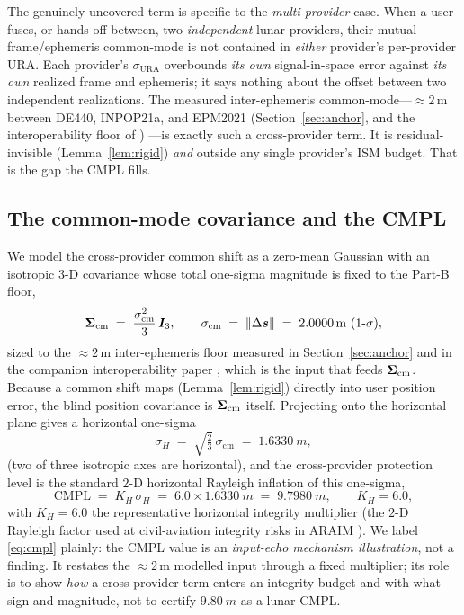 The genuinely uncovered term is specific to the \emph{multi-provider} case. When a user
fuses, or hands off between, two \emph{independent} lunar providers, their mutual
frame/ephemeris common-mode is not contained in \emph{either} provider's per-provider
URA. Each provider's $\sigma_{\mathrm{URA}}$ overbounds \emph{its own} signal-in-space
error against \emph{its own} realized frame and ephemeris; it says nothing about the
offset between two independent realizations. The measured inter-ephemeris
common-mode---$\approx\!2\,$m between DE440, INPOP21a, and EPM2021
(Section~\ref{sec:anchor}, and the interoperability floor of \citep{baweja2026interop})%
---is exactly such a cross-provider term. It is residual-invisible (Lemma~\ref{lem:rigid})
\emph{and} outside any single provider's ISM budget. That is the gap the CMPL fills.

\subsection{The common-mode covariance and the CMPL}
\label{sec:cmpldef}

We model the cross-provider common shift as a zero-mean Gaussian with an isotropic
$3$-D covariance whose total one-sigma magnitude is fixed to the Part-B floor,
\begin{equation}
  \Sig_{\mathrm{cm}} \;=\; \frac{\sigma_{\mathrm{cm}}^2}{3}\,\bm I_3,
  \qquad
  \sigma_{\mathrm{cm}} \;=\; \|\ds\| \;=\; \SI{2.0000}{m}\ \text{(1-}\sigma\text{)},
  \label{eq:cmcov}
\end{equation}
sized to the $\approx\!2\,$m inter-ephemeris floor measured in Section~\ref{sec:anchor}
and in the companion interoperability paper \citep{baweja2026interop}, which is the
input that feeds $\bm{\Sigma}_{\mathrm{cm}}$. Because a common shift maps (Lemma~\ref{lem:rigid})
directly into user position error, the blind position covariance is $\bm{\Sigma}_{\mathrm{cm}}$
itself. Projecting onto the horizontal plane gives a horizontal one-sigma
\begin{equation}
  \sigma_H \;=\; \sqrt{\tfrac{2}{3}}\,\sigma_{\mathrm{cm}} \;=\; \SI{1.6330}{m},
  \label{eq:sigmaH}
\end{equation}
(two of three isotropic axes are horizontal), and the cross-provider protection level is
the standard $2$-D horizontal Rayleigh inflation of this one-sigma,
\begin{equation}
  \mathrm{CMPL} \;=\; K_H\,\sigma_H \;=\; 6.0\times\SI{1.6330}{m} \;=\; \SI{9.7980}{m},
  \qquad K_H = 6.0,
  \label{eq:cmpl}
\end{equation}
with $K_H=6.0$ the representative horizontal integrity multiplier (the $2$-D Rayleigh
factor used at civil-aviation integrity risks in ARAIM \citep{blanch2015,wgc2016araim}).
We label \eqref{eq:cmpl} plainly: the CMPL value is an \emph{input-echo mechanism
illustration}, not a finding. It restates the $\approx\!2\,$m modelled input through a
fixed multiplier; its role is to show \emph{how} a cross-provider term enters an
integrity budget and with what sign and magnitude, not to certify $\SI{9.80}{m}$ as a
lunar CMPL.

